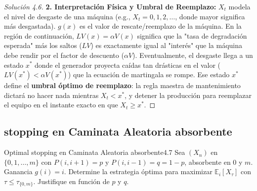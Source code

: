 \documentclass[10pt,a4paper]{article}
\begin{document}
\begin{proof}[Solución 4.6]
    \textbf{2. Interpretación Física y Umbral de Reemplazo:}
    $X_t$ modela el nivel de desgaste de una máquina (e.g., $X_t = 0, 1, 2, \dots$, donde mayor significa más desgastada). $g(x)$ es el valor de rescate/reemplazo de la máquina.
    En la región de continuación, $LV(x) = \alpha V(x)$ significa que la "tasa de degradación esperada" más los saltos ($LV$) es exactamente igual al "interés" que la máquina debe rendir por el factor de descuento ($\alpha V$). 
    Eventualmente, el desgaste llega a un estado $x^*$ donde el generador proyecta caídas tan drásticas en el valor ($LV(x^*) < \alpha V(x^*)$) que la ecuación de martingala se rompe. Ese estado $x^*$ define el \textbf{umbral óptimo de reemplazo}: la regla maestra de mantenimiento dictará no hacer nada mientras $X_t < x^*$, y detener la producción para reemplazar el equipo en el instante exacto en que $X_t \ge x^*$.
\end{proof}

\newpage
\subsection{stopping en Caminata Aleatoria absorbente}

\begin{ejercicio}{Optimal stopping en Caminata Aleatoria absorbente}{4.7}
    Sea $(X_n)$ en $\{0,1,\dots,m\}$ con $P(i,i+1)=p$ y $P(i,i-1)=q=1-p$, absorbente en $0$ y $m$. Ganancia $g(i) = i$. Determine la estrategia óptima para maximizar $\mathbb{E}_i[X_\tau]$ con $\tau \le \tau_{\{0,m\}}$. Justifique en función de $p$ y $q$.
\end{ejercicio}
\end{document}
